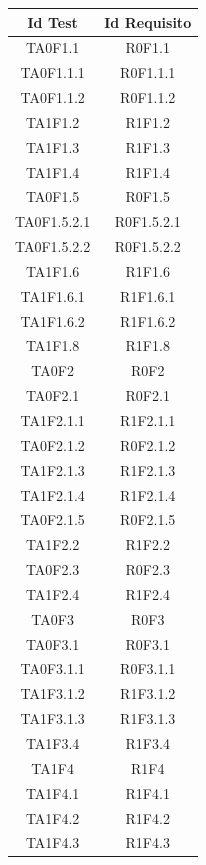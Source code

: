 	\begin{longtable}{|c|c|}
		\hline
		\textbf{Id Test} & \textbf{Id Requisito}\\
		\hline
		\endhead
		TA0F1.1&R0F1.1 \\ \hline
		TA0F1.1.1&R0F1.1.1 \\ \hline
		TA0F1.1.2&R0F1.1.2 \\ \hline
		TA1F1.2&R1F1.2 \\ \hline
		TA1F1.3&R1F1.3 \\ \hline
		TA1F1.4&R1F1.4 \\ \hline
		TA0F1.5&R0F1.5 \\ \hline
		TA0F1.5.2.1&R0F1.5.2.1 \\ \hline
		TA0F1.5.2.2&R0F1.5.2.2 \\ \hline
		TA1F1.6&R1F1.6 \\ \hline
		TA1F1.6.1&R1F1.6.1 \\ \hline
		TA1F1.6.2&R1F1.6.2 \\ \hline
		TA1F1.8&R1F1.8 \\ \hline
		TA0F2&R0F2 \\ \hline
		TA0F2.1&R0F2.1 \\ \hline
		TA1F2.1.1&R1F2.1.1 \\ \hline
		TA0F2.1.2&R0F2.1.2 \\ \hline
		TA1F2.1.3&R1F2.1.3 \\ \hline
		TA1F2.1.4&R1F2.1.4 \\ \hline
		TA0F2.1.5&R0F2.1.5 \\ \hline
		TA1F2.2&R1F2.2 \\ \hline
		TA0F2.3&R0F2.3 \\ \hline
		TA1F2.4&R1F2.4 \\ \hline
		TA0F3&R0F3 \\ \hline
		TA0F3.1&R0F3.1 \\ \hline
		TA0F3.1.1&R0F3.1.1 \\ \hline
		TA1F3.1.2&R1F3.1.2 \\ \hline
		TA1F3.1.3&R1F3.1.3 \\ \hline
		TA1F3.4&R1F3.4 \\ \hline
		TA1F4&R1F4 \\ \hline
		TA1F4.1&R1F4.1 \\ \hline
		TA1F4.2&R1F4.2 \\ \hline
		TA1F4.3&R1F4.3 \\ \hline
	\end{longtable}

